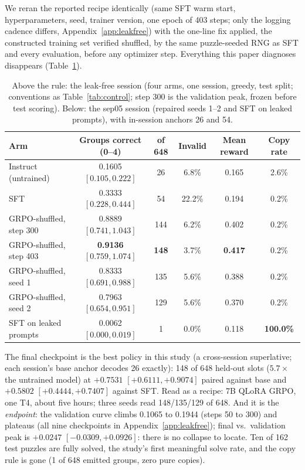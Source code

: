 \documentclass{article}
\begin{document}
We reran the reported recipe identically (same SFT warm start, hyperparameters, seed, trainer version, one epoch of 403 steps; only the logging cadence differs, Appendix~\ref{app:leakfree}) with the one-line fix applied, the constructed training set verified shuffled, by the same puzzle-seeded RNG as SFT and every evaluation, before any optimizer step. Everything this paper diagnoses
disappears (Table~\ref{tab:leakfree}).

\begin{table}[t]
\centering
\caption{Above the rule: the leak-free session (four arms, one session, greedy, test split; conventions as Table~\ref{tab:control}; step 300 is the validation peak, frozen before test scoring). Below: the sep05 session (repaired seeds 1--2 and SFT on leaked prompts), with in-session anchors 26 and 54.}
\label{tab:leakfree}
\footnotesize
\setlength{\tabcolsep}{4pt}
\begin{tabular}{lccccc}
\toprule
Arm & Groups correct (0--4) & of 648 & Invalid & Mean reward & Copy rate \\
\midrule
Instruct (untrained) & 0.1605 $[0.105, 0.222]$ & 26 & 6.8\% & 0.165 & 2.6\% \\
SFT & 0.3333 $[0.228, 0.444]$ & 54 & 22.2\% & 0.194 & 0.2\% \\
GRPO-shuffled, step 300 & 0.8889 $[0.741, 1.043]$ & 144 & 6.2\% & 0.402 & 0.2\% \\
GRPO-shuffled, step 403 & \textbf{0.9136} $[0.759, 1.074]$ & \textbf{148} & 3.7\% & \textbf{0.417} & 0.2\% \\
\midrule
GRPO-shuffled, seed 1 & 0.8333 $[0.691, 0.988]$ & 135 & 5.6\% & 0.388 & 0.2\% \\
GRPO-shuffled, seed 2 & 0.7963 $[0.654, 0.951]$ & 129 & 5.6\% & 0.370 & 0.2\% \\
SFT on leaked prompts & 0.0062 $[0.000, 0.019]$ & 1 & 0.0\% & 0.118 & \textbf{100.0\%} \\
\bottomrule
\end{tabular}
\end{table}

The final checkpoint is the best policy in this study (a cross-session superlative; each session's base anchor decodes 26 exactly): 148 of 648 held-out slots ($5.7\times$ the untrained model) at $+0.7531$ $[+0.6111, +0.9074]$ paired against base and $+0.5802$ $[+0.4444, +0.7407]$ against SFT. Read as a recipe: 7B QLoRA GRPO, one T4, about five hours; three seeds read 148/135/129 of 648. And it is the
\emph{endpoint}: the validation curve climbs 0.1065 to 0.1944 (steps 50 to 300) and plateaus (all nine checkpoints in
Appendix~\ref{app:leakfree}); final vs.\ validation peak is $+0.0247$
$[-0.0309, +0.0926]$: there is no collapse to locate. Ten of 162 test puzzles are fully solved, the study's first meaningful solve rate, and the copy rule is gone (1 of 648 emitted groups, zero pure copies).
\end{document}
